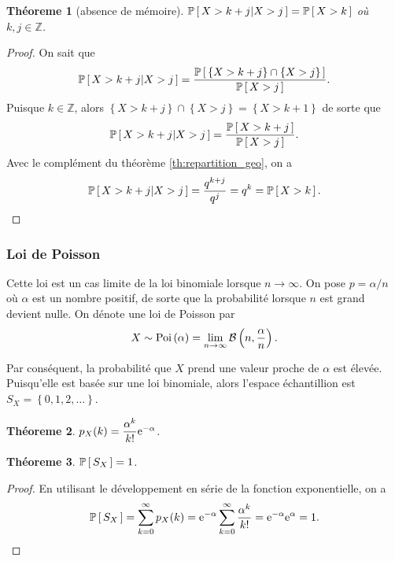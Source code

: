 \documentclass[11pt]{article}
\renewcommand\P[1]{%
	\ensuremath{%
		\mathbb{P}\left[\,#1\,\right]%
	}%
}%
\newcommand\Pg[2]{%
	\ensuremath{%
		\mathbb{P}\left[\,#1\middle\rvert#2\,\right]%
	}%
}%
\newcommand\e{%
	\ensuremath{%
		\mathrm{e}%
	}%
}%
\newcommand\Bin[2]{%
	\ensuremath{%
		\mathcal{B}\left(#1,#2\right)%
	}%
}%
\newcommand\Poi[1]{%
	\ensuremath{%
		\mathrm{Poi}\left(#1\right)%
	}%
}%
\newtheorem{theoreme}{Théoreme}[section]
\begin{document}
\begin{theoreme}[absence de mémoire]
	$\Pg{X>k+j}{X>j}=\P{X>k}$ où $k,j\in\mathbb{Z}$.
\end{theoreme}

\begin{proof}
	On sait que
	\begin{equation*}
		\Pg{X>k+j}{X>j}=\frac{\P{
			\left\{X>k+j\right\}\cap
	   		\left\{X>j\right\}}}{\P{X>j}}.
	\end{equation*}
	Puisque $k\in\mathbb{Z}$, alors $\left\{X>k+j\right\}\cap\left\{X>j\right\}
	=\left\{X>k+1\right\}$ de sorte que
	\begin{equation*}
		\Pg{X>k+j}{X>j}=\frac{\P{X>k+j}}{\P{X>j}}.
	\end{equation*}
	Avec le complément du théorème \ref{th:repartition_geo}, on a
	\begin{equation*}
		\Pg{X>k+j}{X>j}=\frac{q^{k+j}}{q^{j}}=q^{k}=\P{X>k}.\qedhere
	\end{equation*}
\end{proof}

\subsubsection{Loi de Poisson}
Cette loi est un cas limite de la loi binomiale lorsque $n\rightarrow\infty$.
On pose $p=\alpha/n$ où $\alpha$ est un nombre positif, de sorte que la 
probabilité lorsque $n$ est grand devient nulle. On dénote une loi de Poisson
par
\begin{equation*}
	X\sim\Poi{\alpha}
	=\lim_{n\rightarrow\infty}\Bin{n}{\frac{\alpha}{n}}.
\end{equation*}

Par conséquent, la probabilité que $X$ prend une valeur proche de $\alpha$ est
élevée. Puisqu'elle est basée sur une loi binomiale, alors l'espace
échantillion est $S_X=\left\{0,1,2,\dots\right\}$.

\begin{theoreme}
	$p_X(k)=\dfrac{\alpha^k}{k!}\e^{-\alpha}$.
\end{theoreme}

\begin{theoreme}
	$\P{S_X}=1$.
\end{theoreme}

\begin{proof}
	En utilisant le développement en série de la fonction exponentielle, on a
	\begin{equation*}
		\P{S_X}
		=\sum_{k=0}^\infty p_X(k)
		=\e^{-\alpha}\sum_{k=0}^\infty\frac{\alpha^k}{k!}
		=\e^{-\alpha}\e^\alpha
		=1.\qedhere
	\end{equation*}
\end{proof}
\end{document}
